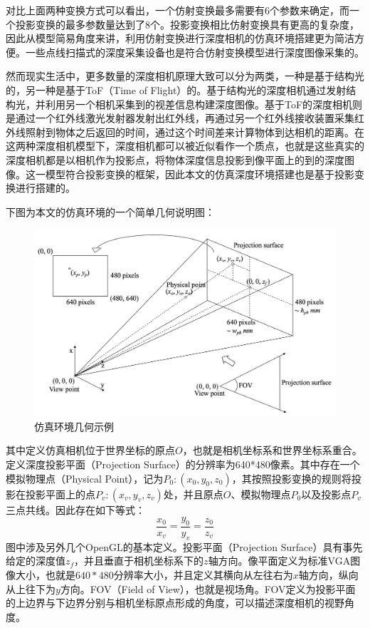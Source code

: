 对比上面两种变换方式可以看出，一个仿射变换最多需要有6个参数来确定，而一个投影变换的最多参数量达到了8个。投影变换相比仿射变换具有更高的复杂度，因此从模型简易角度来讲，利用仿射变换进行深度相机的仿真环境搭建更为简洁方便。一些点线扫描式的深度采集设备也是符合仿射变换模型进行深度图像采集的。

然而现实生活中，更多数量的深度相机原理大致可以分为两类，一种是基于结构光的，另一种是基于ToF（Time of Flight）的。基于结构光的深度相机通过发射结构光，并利用另一个相机采集到的视差信息构建深度图像。基于ToF的深度相机则是通过一个红外线激光发射器发射出红外线，再通过另一个红外线接收装置采集红外线照射到物体之后返回的时间，通过这个时间差来计算物体到达相机的距离。在这两种深度相机模型下，深度相机都可以被近似看作一个质点，也就是这些真实的深度相机都是以相机作为投影点，将物体深度信息投影到像平面上的到的深度图像。这一模型符合投影变换的框架，因此本文的仿真深度环境搭建也是基于投影变换进行搭建的。

下图为本文的仿真环境的一个简单几何说明图：
\begin{figure}[htb]
	\centering 
	\includegraphics[width=\textwidth]{./mypic/projection.jpg} 
	\caption{仿真环境几何示例} 
\end{figure}

其中定义仿真相机位于世界坐标的原点$O$，也就是相机坐标系和世界坐标系重合。定义深度投影平面（Projection Surface）的分辨率为640*480像素。其中存在一个模拟物理点（Physical Point），记为$P_0:(x_0,y_0,z_0)$，其按照投影变换的规则将投影在投影平面上的点$P_v:(x_v,y_v,z_v)$处，并且原点$O$、模拟物理点$P_0$以及投影点$P_v$三点共线。因此存在如下等式：
\begin{equation}
	\frac{x_0}{x_v}=\frac{y_0}{y_v}=\frac{z_0}{z_v}
\end{equation}
图中涉及另外几个OpenGL的基本定义。投影平面（Projection Surface）具有事先给定的深度值$z_f$，并且垂直于相机坐标系下的$z$轴方向。像平面定义为标准VGA图像大小，也就是$640*480$分辨率大小，并且定义其横向从左往右为$x$轴方向，纵向从上往下为$y$方向。FOV（Field of View），也就是视场角。FOV定义为投影平面的上边界与下边界分别与相机坐标原点形成的角度，可以描述深度相机的视野角度。


